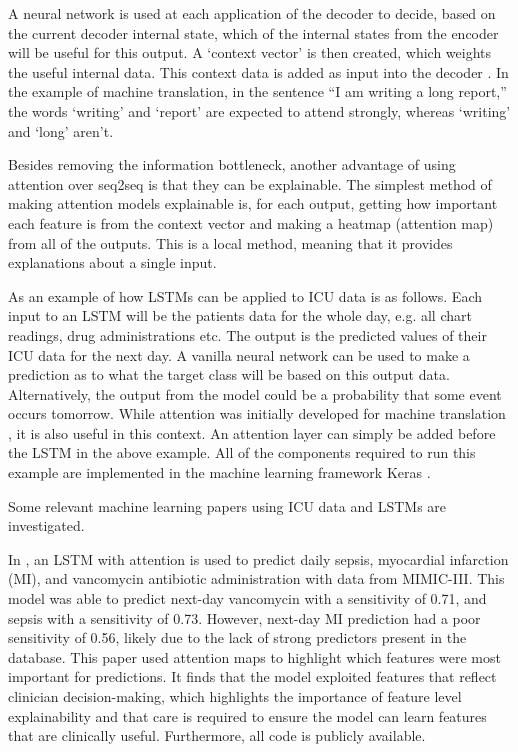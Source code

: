 \documentclass[12pt]{article}
\begin{document}
A neural network is used at each application of the decoder to decide, based on the current decoder internal state, which of the internal states from the encoder will be useful for this output. A `context vector' is then created, which weights the useful internal data. This context data is added as input into the decoder \cite{weng2018attention}. In the example of machine translation, in the sentence ``I am writing a long report,'' the words `writing' and `report' are expected to attend strongly, whereas `writing' and `long' aren't.

Besides removing the information bottleneck, another advantage of using attention over seq2seq is that they can be explainable. The simplest method of making attention models explainable is, for each output, getting how important each feature is from the context vector and making a heatmap (attention map) from all of the outputs. This is a local method, meaning that it provides explanations about a single input.

As an example of how LSTMs can be applied to ICU data is as follows. Each input to an LSTM will be the patients data for the whole day, e.g. all chart readings, drug administrations etc. The output is the predicted values of their ICU data for the next day. A vanilla neural network can be used to make a prediction as to what the target class will be based on this output data. Alternatively, the output from the model could be a probability that some event occurs tomorrow. While attention was initially developed for machine translation \cite{AttentionPaper}, it is also useful in this context. An attention layer can simply be added before the LSTM in the above example. All of the components required to run this example are implemented in the machine learning framework Keras \cite{keras}.

Some relevant machine learning papers using ICU data and LSTMs are investigated.

In \cite{KajiLSTM}, an LSTM with attention is used to predict daily sepsis, myocardial infarction (MI), and vancomycin antibiotic administration with data from MIMIC-III. This model was able to predict next-day vancomycin with a sensitivity of  0.71, and sepsis with a sensitivity of 0.73. However, next-day MI prediction had a poor sensitivity of 0.56, likely due to the lack of strong predictors present in the database. This paper used attention maps to highlight which features were most important for predictions. It finds that the model exploited features that reflect clinician decision-making, which highlights the importance of feature level explainability and that care is required to ensure the model can learn features that are clinically useful. Furthermore, all code is publicly available.
\end{document}
